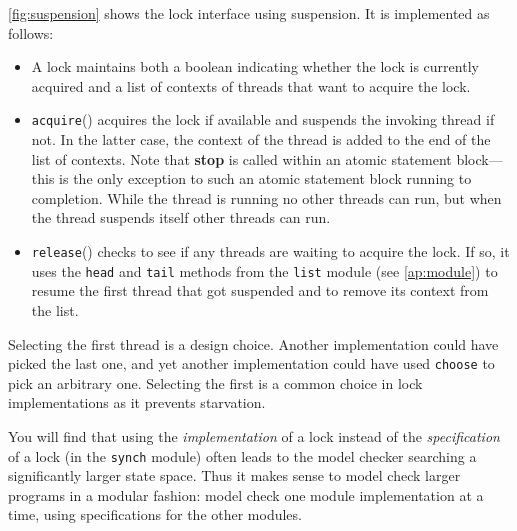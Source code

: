 \documentclass{report}
\begin{document}
\autoref{fig:suspension} shows the lock interface using suspension.
It is implemented as follows:
\begin{itemize}
\item A lock maintains both a boolean indicating whether the
lock is currently acquired and a list of contexts of threads that want to
acquire the lock.
\item
\texttt{acquire}()
%
acquires the lock if available and suspends the invoking thread if not.
In the latter case, the context of the thread is added to the end of the list of contexts.
Note that \textbf{stop} is called within an atomic statement block---this is
the only exception to such an atomic statement block running to completion.
While the
thread is running no other threads can run, but when the thread suspends itself
other threads can run.
\item
\texttt{release}()
%
checks to see if any threads are waiting to acquire the lock.
If so, it uses the \texttt{head} and \texttt{tail}
methods from the \texttt{list} module (see \autoref{ap:module})
to resume the first thread that got
suspended and to remove its context from the list.
\end{itemize}
Selecting the first thread is a design choice.  Another implementation could
have picked the last one, and yet another implementation could have used
\texttt{choose} to pick an arbitrary one.  Selecting the first is a common
choice in lock implementations as it prevents starvation.

You will find that using the \emph{implementation} of a lock instead
of the \emph{specification} of a lock (in the \texttt{synch} module)
often leads to the model checker searching a
significantly larger state space.
Thus it makes sense to model check larger programs in a modular fashion:
model check one module implementation at a time, using
specifications for the other modules.
\end{document}
